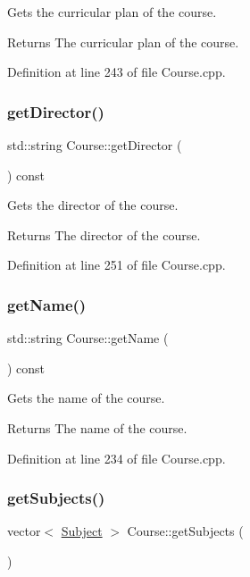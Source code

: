 Gets the curricular plan of the course. \begin{DoxyReturn}{Returns}
The curricular plan of the course. 
\end{DoxyReturn}


Definition at line 243 of file Course.\+cpp.

\mbox{\label{classCourse_a604c801567695fc34bc932695a8943a0}} 
\subsubsection{\texorpdfstring{get\+Director()}{getDirector()}}
{\footnotesize\ttfamily std\+::string Course\+::get\+Director (\begin{DoxyParamCaption}{ }\end{DoxyParamCaption}) const}

Gets the director of the course. \begin{DoxyReturn}{Returns}
The director of the course. 
\end{DoxyReturn}


Definition at line 251 of file Course.\+cpp.

\mbox{\label{classCourse_ab26b47d93027fcecffdf42b2ee526f87}} 
\subsubsection{\texorpdfstring{get\+Name()}{getName()}}
{\footnotesize\ttfamily std\+::string Course\+::get\+Name (\begin{DoxyParamCaption}{ }\end{DoxyParamCaption}) const}

Gets the name of the course. \begin{DoxyReturn}{Returns}
The name of the course. 
\end{DoxyReturn}


Definition at line 234 of file Course.\+cpp.

\mbox{\label{classCourse_a69d1fb52aa6c36851e0f6a8a5383de3d}} 
\subsubsection{\texorpdfstring{get\+Subjects()}{getSubjects()}}
{\footnotesize\ttfamily vector$<$ \hyperlink{classSubject}{Subject} $>$ Course\+::get\+Subjects (\begin{DoxyParamCaption}{ }\end{DoxyParamCaption})}

